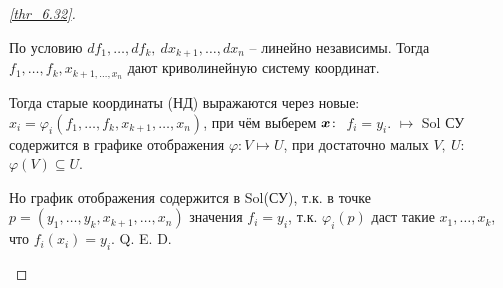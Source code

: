 \begin{proof}[\ref{thr_6.32}]   

\begin{enumerate*}
    \item По условию $df_1, \ldots, df_k, \ dx_{k+1}, \ldots, dx_n$ -- линейно независимы. Тогда $f_1, \ldots, f_k, x_{k+1, \ldots, x_n}$ дают криволинейную систему координат. 
    \item Тогда старые координаты (НД) выражаются через новые: $x_i = \varphi_i(f_1, \ldots, f_k, x_{k+1}, \ldots, x_n)$, при чём выберем $\mbox{\boldmath $x$}\colon$ $f_i = y_i$. $\mapsto$ Sol СУ содержится в графике отображения $\varphi \colon V \mapsto  U$, при достаточно малых $V, \ U$: $\varphi(V) \subseteq U$. 
    \item Но график отображения содержится в Sol(СУ), т.к. в точке $p = (y_1, \ldots, y_k, x_{k+1},\ldots,x_n)$ значения $f_i = y_i$, т.к. $\varphi_i (p)$ даст такие $x_1, \ldots, x_k$, что $f_i(x_i)=y_i$. Q. E. D.
\end{enumerate*}
    
\end{proof}
